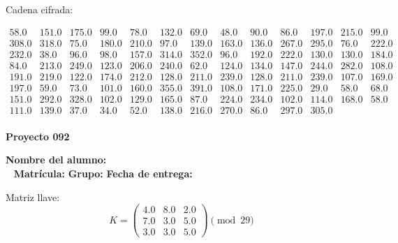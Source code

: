 \documentclass[12pt]{article}
\begin{document}
Cadena cifrada:
\begin{center}
$\begin{array}{lllllllllllll}
58.0 & 151.0 & 175.0 & 99.0 & 78.0 & 132.0 & 69.0 & 48.0 & 90.0 & 86.0 & 197.0 & 215.0 & 99.0\\
308.0 & 318.0 & 75.0 & 180.0 & 210.0 & 97.0 & 139.0 & 163.0 & 136.0 & 267.0 & 295.0 & 76.0 & 222.0\\
232.0 & 38.0 & 96.0 & 98.0 & 157.0 & 314.0 & 352.0 & 96.0 & 192.0 & 222.0 & 130.0 & 130.0 & 184.0\\
84.0 & 213.0 & 249.0 & 123.0 & 206.0 & 240.0 & 62.0 & 124.0 & 134.0 & 147.0 & 244.0 & 282.0 & 108.0\\
191.0 & 219.0 & 122.0 & 174.0 & 212.0 & 128.0 & 211.0 & 239.0 & 128.0 & 211.0 & 239.0 & 107.0 & 169.0\\
197.0 & 59.0 & 73.0 & 101.0 & 160.0 & 355.0 & 391.0 & 108.0 & 171.0 & 225.0 & 29.0 & 58.0 & 68.0\\
151.0 & 292.0 & 328.0 & 102.0 & 129.0 & 165.0 & 87.0 & 224.0 & 234.0 & 102.0 & 114.0 & 168.0 & 58.0\\
111.0 & 139.0 & 37.0 & 34.0 & 52.0 & 138.0 & 216.0 & 270.0 & 86.0 & 297.0 & 305.0\\
\end{array}$
\end{center}

\newpage


\textbf{Proyecto 092}

\textbf{Nombre del alumno:} \underline{\hspace{13cm}}\\\
\vspace{1cm}
\textbf{Matrícula:} \underline{\hspace{4cm}} \hspace{1cm}
\textbf{Grupo:} \underline{\hspace{2cm}}
\textbf{Fecha de entrega:} \underline{\hspace{2cm}}

\medskip

Matriz llave:
\[
K = \begin{pmatrix}
4.0 & 8.0 & 2.0\\
7.0 & 3.0 & 5.0\\
3.0 & 3.0 & 5.0
\end{pmatrix} \pmod{29}
\]
\end{document}
